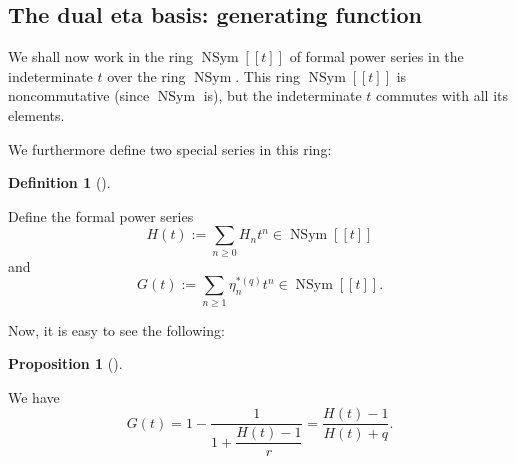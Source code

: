 \documentclass[numbers=enddot,12pt,final,onecolumn,notitlepage]{scrartcl}%
\theoremstyle{definition}
\newtheorem{prop}[theo]{Proposition}
\newenvironment{proposition}[1][]
{\begin{prop}[#1]\begin{leftbar}}
{\end{leftbar}\end{prop}}
\newtheorem{defi}[theo]{Definition}
\newenvironment{definition}[1][]
{\begin{defi}[#1]\begin{leftbar}}
{\end{leftbar}\end{defi}}
\let\sumnonlimits\sum
\renewcommand{\sum}{\sumnonlimits\limits}
\begin{document}
\subsection{The dual eta basis: generating function}

We shall now work in the ring $\operatorname*{NSym}\left[  \left[  t\right]
\right]  $ of formal power series in the indeterminate $t$ over the ring
$\operatorname*{NSym}$. This ring $\operatorname*{NSym}\left[  \left[
t\right]  \right]  $ is noncommutative (since $\operatorname*{NSym}$ is), but
the indeterminate $t$ commutes with all its elements.

We furthermore define two special series in this ring:

\begin{definition}
Define the formal power series%
\[
H\left(  t\right)  :=\sum_{n\geq0}H_{n}t^{n}\in\operatorname*{NSym}\left[
\left[  t\right]  \right]
\]
and
\[
G\left(  t\right)  :=\sum_{n\geq1}\eta_{n}^{\ast\left(  q\right)  }t^{n}%
\in\operatorname*{NSym}\left[  \left[  t\right]  \right]  .
\]

\end{definition}

Now, it is easy to see the following:

\begin{proposition}
\label{prop.Gt-through-Ht}We have%
\[
G\left(  t\right)  =1-\dfrac{1}{1+\dfrac{H\left(  t\right)  -1}{r}}%
=\dfrac{H\left(  t\right)  -1}{H\left(  t\right)  +q}.
\]

\end{proposition}
\end{document}
